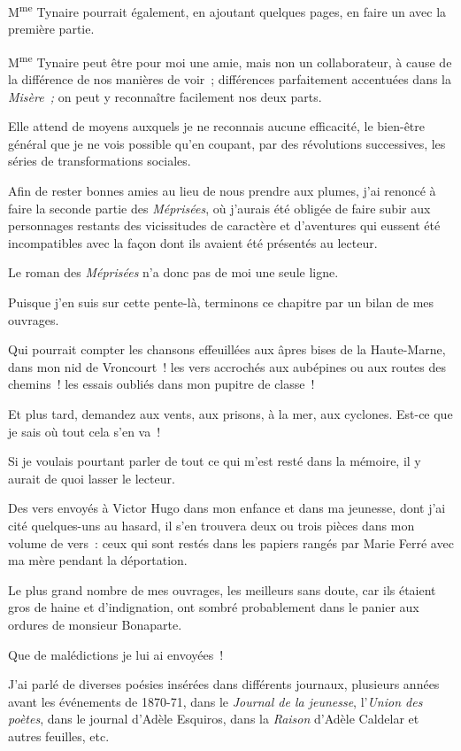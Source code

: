 \documentclass[french,twoside]{book} %
\begin{document}
M\textsuperscript{me} Tynaire pourrait également, en ajoutant quelques pages, en faire un avec la première partie.\par
M\textsuperscript{me} Tynaire peut être pour moi une amie, mais non un collaborateur, à cause de la différence de nos manières de voir ; différences parfaitement accentuées dans la \emph{Misère ;} on peut y reconnaître facilement nos deux parts.\par
Elle attend de moyens auxquels je ne reconnais aucune efficacité, le bien-être général que je ne vois possible qu’en coupant, par des révolutions successives, les séries de transformations sociales.\par
Afin de rester bonnes amies au lieu de nous  prendre aux plumes, j’ai renoncé à faire la seconde partie des \emph{Méprisées}, où j’aurais été obligée de faire subir aux personnages restants des vicissitudes de caractère et d’aventures qui eussent été incompatibles avec la façon dont ils avaient été présentés au lecteur.\par
Le roman des \emph{Méprisées} n’a donc pas de moi une seule ligne.\par
Puisque j’en suis sur cette pente-là, terminons ce chapitre par un bilan de mes ouvrages.\par
Qui pourrait compter les chansons effeuillées aux âpres bises de la Haute-Marne, dans mon nid de Vroncourt ! les vers accrochés aux aubépines ou aux routes des chemins ! les essais oubliés dans mon pupitre de classe !\par
Et plus tard, demandez aux vents, aux prisons, à la mer, aux cyclones. Est-ce que je sais où tout cela s’en va !\par
Si je voulais pourtant parler de tout ce qui m’est resté dans la mémoire, il y aurait de quoi lasser le lecteur.\par
Des vers envoyés à Victor Hugo dans mon enfance et dans ma jeunesse, dont j’ai cité quelques-uns au hasard, il s’en trouvera deux ou trois pièces dans mon volume de vers : ceux qui sont restés dans les papiers rangés par Marie Ferré avec ma mère pendant la déportation.\par
 Le plus grand nombre de mes ouvrages, les meilleurs sans doute, car ils étaient gros de haine et d’indignation, ont sombré probablement dans le panier aux ordures de monsieur Bonaparte.\par
Que de malédictions je lui ai envoyées !\par
J’ai parlé de diverses poésies insérées dans différents journaux, plusieurs années avant les événements de 1870-71, dans le \emph{Journal de la jeunesse}, l’\emph{Union des poètes}, dans le journal d’Adèle Esquiros, dans la \emph{Raison} d’Adèle Caldelar et autres feuilles, etc.\par
\end{document}
